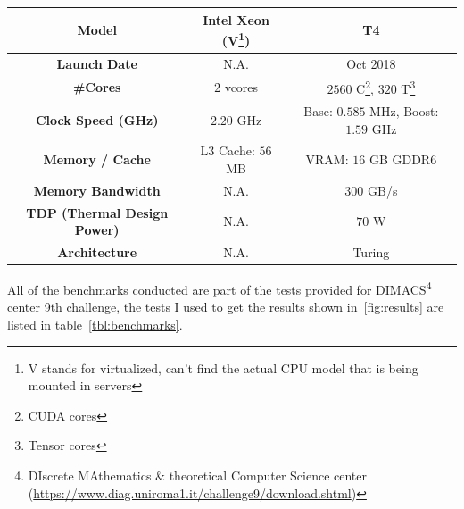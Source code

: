 \documentclass[a4paper,10pt]{article}
\begin{document}
\begin{center}
\begin{longtable}{|c|c|c|}
		\textbf{Model}                      & Intel Xeon (V\footnote{V stands for virtualized, can't find the actual CPU model that is being mounted in servers}) & T4                                                                  \\\hline
		\textbf{Launch Date}                & N.A.                                                                                                                & Oct 2018                                                            \\\hline
		\textbf{\#Cores}                    & $2$ vcores                                                                                                          & $\num{2560}$ C\footnote{CUDA cores}, $320$ T\footnote{Tensor cores} \\\hline
		\textbf{Clock Speed (GHz)}          & $\num{2.20}$ GHz                                                                                                    & Base: $0.585$ MHz, Boost: $1.59$ GHz                                \\\hline
		\textbf{Memory / Cache}             & L3 Cache: $56$ MB                                                                                                   & VRAM: $16$ GB GDDR6                                                 \\\hline
		\textbf{Memory Bandwidth}           & N.A.                                                                                                                & 300 GB/s                                                            \\\hline
		\textbf{TDP (Thermal Design Power)} & N.A.                                                                                                                & $70$ W                                                              \\\hline
		\textbf{Architecture}               & N.A.                                                                                                                & Turing
	\end{longtable}
\end{center}
All of the benchmarks conducted are part of the tests provided for DIMACS\footnote{DIscrete MAthematics \& theoretical Computer Science center (\url{https://www.diag.uniroma1.it/challenge9/download.shtml})} center 9th challenge, the tests I used to get the results shown in~\ref{fig:results} are listed in table~\ref{tbl:benchmarks}.
\end{document}

